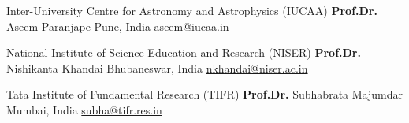 


\begin{cventries}


\cventry
{Inter-University Centre for Astronomy and Astrophysics (IUCAA)} %
{\textbf{  Prof.Dr.} Aseem Paranjape} %
{Pune, India} %
{\href{mailto:aseem@iucaa.in}{aseem@iucaa.in}} %
{}



\cventry
{National Institute of Science Education and Research (NISER)} %
{\textbf{  Prof.Dr.} Nishikanta Khandai} %
{Bhubaneswar, India} %
{\href{mailto:nkhandai@niser.ac.in}{nkhandai@niser.ac.in}} %
{}


\cventry
{Tata Institute of Fundamental Research (TIFR)} %
{\textbf{  Prof.Dr.} Subhabrata Majumdar} %
{Mumbai, India} %
{\href{mailto:subha@tifr.res.in}{subha@tifr.res.in}} %
{}





\end{cventries}
